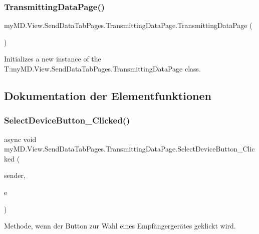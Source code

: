 \subsubsection{\texorpdfstring{Transmitting\+Data\+Page()}{TransmittingDataPage()}}
{\footnotesize\ttfamily my\+M\+D.\+View.\+Send\+Data\+Tab\+Pages.\+Transmitting\+Data\+Page.\+Transmitting\+Data\+Page (\begin{DoxyParamCaption}{ }\end{DoxyParamCaption})}



Initializes a new instance of the T\+:my\+M\+D.\+View.\+Send\+Data\+Tab\+Pages.\+Transmitting\+Data\+Page class. 



\subsection{Dokumentation der Elementfunktionen}
\mbox{\label{classmy_m_d_1_1_view_1_1_send_data_tab_pages_1_1_transmitting_data_page_a5412e851cb3b9c6f53c66edbae50292d}} 
\subsubsection{\texorpdfstring{Select\+Device\+Button\+\_\+\+Clicked()}{SelectDeviceButton\_Clicked()}}
{\footnotesize\ttfamily async void my\+M\+D.\+View.\+Send\+Data\+Tab\+Pages.\+Transmitting\+Data\+Page.\+Select\+Device\+Button\+\_\+\+Clicked (\begin{DoxyParamCaption}\item[{object}]{sender,  }\item[{Event\+Args}]{e }\end{DoxyParamCaption})}



Methode, wenn der Button zur Wahl eines Empfängergerätes geklickt wird. 


